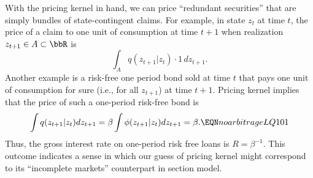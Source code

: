 With the pricing kernel in hand, we can price ``redundant securities'' that are simply bundles of 
state-contingent claims. 
For example, in state $z_t $  at time $t$, the price  of a
claim to one unit of  consumption
at time $t+1$ when realization $z_{t+1} \in A \subset \bbR$ is 
$$
\int_A  q(z_{t+1} | z_t ) \cdot 1 \, d  z_{t+1} .
$$ 
 Another example is a risk-free one period bond sold at time $t$ that  pays one unit of consumption for sure
  (i.e.,  for all $z_{t+1}$) at time $t+1$. %
Pricing kernel 
implies that the price of  such a   one-period risk-free bond is
$$ \int q(z_{t+1} | z_t) d z_{t+1} = \beta \int \phi(z_{t+1} | z_t) d z_{t+1} = \beta.  \EQN noarbitrageLQ101 $$
Thus,   the gross interest rate on one-period risk free loans is  $R=\beta^{-1}$. This outcome indicates a sense in which our guess of pricing kernel  might 
correspond to its ``incomplete markets'' counterpart  in section  model. 



